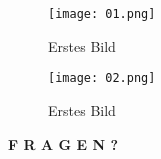 \documentclass{beamer}
\begin{document}
\begin{frame}
\begin{figure}[htbp] 
  \centering
     \texttt{[image: 01.png]}
  \caption{Erstes Bild}
  \label{fig:Bild1}
\end{figure}
\end{frame}

\begin{frame}
\begin{figure}[htbp] 
  \centering
     \texttt{[image: 02.png]}
  \caption{Erstes Bild}
  \label{fig:Bild1}
\end{figure}

\end{frame}



\begin{frame}
\Huge \center \textbf{F R A G E N ?}
\end{frame}
\end{document}
